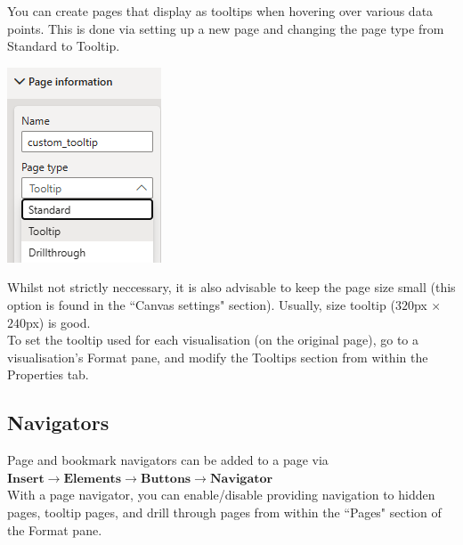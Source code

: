 \documentclass[10pt, openany, twocolumn]{book}
\begin{document}
You can create pages that display as tooltips when hovering over various data points. This is done via setting up a new page and changing the page type from Standard to Tooltip.

\begin{center}
    \includegraphics[width=0.45\columnwidth]{images/tooltip_page_type.png}
\end{center}
Whilst not strictly neccessary, it is also advisable to keep the page size small (this option is found in the ``Canvas settings" section). Usually, size tooltip ($320$px $\times$ $240$px) is good.\\

To set the tooltip used for each visualisation (on the original page), go to a visualisation's Format pane, and modify the Tooltips section from within the Properties tab.

\subsection*{Navigators}

Page and bookmark navigators can be added to a page via \\

$\textbf{Insert} \rightarrow \textbf{Elements} \rightarrow \textbf{Buttons} \rightarrow \textbf{Navigator}$ \\

With a page navigator, you can enable/disable providing navigation to hidden pages, tooltip pages, and drill through pages from within the ``Pages" section of the Format pane.
\end{document}
